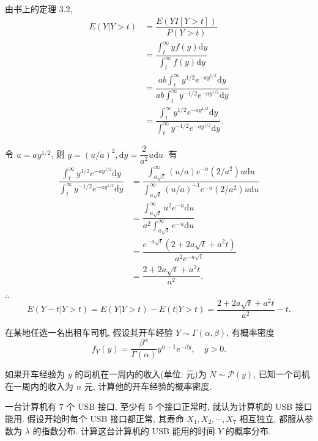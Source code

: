 \documentclass{ctexart}
\begin{document}
\begin{solution}
    由书上的定理 3.2,
    \begin{align*}
        E(Y|Y>t) & =\dfrac{E(YI[Y>t])}{P(Y>t)} \\
        & =\dfrac{\int_t^\infty yf(y)\mathrm{d}y}{\int_t^\infty f(y)\mathrm{d}y} \\
        & =\dfrac{ab\int_t^\infty y^{1/2}e^{-ay^{1/2}}\mathrm{d}y}{ab\int_t^\infty y^{-1/2}e^{-ay^{1/2}}\mathrm{d}y} \\
        & =\dfrac{\int_t^\infty y^{1/2}e^{-ay^{1/2}}\mathrm{d}y}{\int_t^\infty y^{-1/2}e^{-ay^{1/2}}\mathrm{d}y}.
    \end{align*}

    令 $u=ay^{1/2}$, 则 $y=(u/a)^2,\mathrm{d}y=\dfrac{2}{a^2}u\mathrm{d}u$. 有
    \begin{align*}
        \dfrac{\int_t^\infty y^{1/2}e^{-ay^{1/2}}\mathrm{d}y}{\int_t^\infty y^{-1/2}e^{-ay^{1/2}}\mathrm{d}y} & =\dfrac{\int_{a\sqrt{t}}^\infty(u/a)e^{-u}(2/a^2)u\mathrm{d}u}{\int_{a\sqrt{t}}^\infty(u/a)^{-1}e^{-u}(2/a^2)u\mathrm{d}u} \\
        & =\dfrac{\int_{a\sqrt{t}}^\infty u^2e^{-u}\mathrm{d}u}{a^2\int_{a\sqrt{t}}^\infty e^{-u}\mathrm{d}u} \\
        & =\dfrac{e^{-a\sqrt{t}}(2+2a\sqrt{t}+a^2t)}{a^2e^{-a\sqrt{t}}} \\
        & =\dfrac{2+2a\sqrt{t}+a^2t}{a^2}.
    \end{align*}

    $\therefore$
    \[E(Y-t|Y>t)=E(Y|Y>t)-E(t|Y>t)=\dfrac{2+2a\sqrt{t}+a^2t}{a^2}-t.\]
\end{solution}
\begin{exercise}%
    在某地任选一名出租车司机, 假设其开车经验 $Y\sim\Gamma(\alpha,\beta)$, 有概率密度
    \[f_Y(y)=\dfrac{\beta^\alpha}{\Gamma(\alpha)}y^{\alpha-1}e^{-\beta y},\quad y>0.\]

    如果开车经验为 $y$ 的司机在一周内的收入(单位: 元)为 $N\sim\mathcal{P}(y)$, 已知一个司机在一周内的收入为 $n$ 元, 计算他的开车经验的概率密度.
\end{exercise}
\begin{solution}
\end{solution}
\begin{exercise}%
    一台计算机有 $7$ 个 USB 接口, 至少有 $5$ 个接口正常时, 就认为计算机的 USB 接口能用. 假设开始时每个 USB 接口都正常, 其寿命 $X_1,X_2,\cdots,X_7$ 相互独立, 都服从参数为 $\lambda$ 的指数分布. 计算这台计算机的 USB 能用的时间 $Y$ 的概率分布.
\end{exercise}
\end{document}
